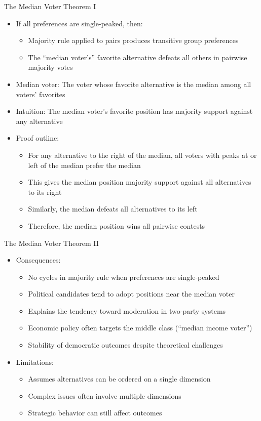 \documentclass[10pt,handout]{beamer}
\begin{document}
\begin{frame}{The Median Voter Theorem I}
  \begin{itemize}[<+->]
    \item If all preferences are single-peaked, then:
      \begin{itemize}
        \item Majority rule applied to pairs produces transitive group preferences
        \item The ``median voter's'' favorite alternative defeats all others in pairwise majority votes
      \end{itemize}
    \item Median voter: The voter whose favorite alternative is the median among all voters' favorites
    \item Intuition: The median voter's favorite position has majority support against any alternative
    \item Proof outline:
      \begin{itemize}
        \item For any alternative to the right of the median, all voters with peaks at or left of the median prefer the median
        \item This gives the median position majority support against all alternatives to its right
        \item Similarly, the median defeats all alternatives to its left
        \item Therefore, the median position wins all pairwise contests
      \end{itemize}
  \end{itemize}
\end{frame}

\begin{frame}{The Median Voter Theorem II}
  \begin{itemize}[<+->]
    \item Consequences:
      \begin{itemize}
        \item No cycles in majority rule when preferences are single-peaked
        \item Political candidates tend to adopt positions near the median voter
        \item Explains the tendency toward moderation in two-party systems
        \item Economic policy often targets the middle class (``median income voter'')
        \item Stability of democratic outcomes despite theoretical challenges
      \end{itemize}
    \item Limitations:
      \begin{itemize}
        \item Assumes alternatives can be ordered on a single dimension
        \item Complex issues often involve multiple dimensions
        \item Strategic behavior can still affect outcomes
      \end{itemize}
  \end{itemize}
\end{frame}
\end{document}
